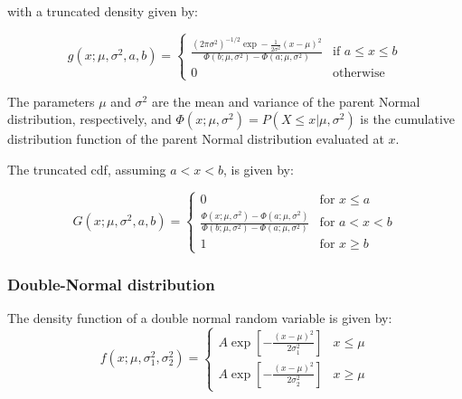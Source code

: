 \documentclass[review]{elsarticle}
\begin{document}
with a truncated density given by:

$$ g(x; \mu,\sigma^2,a,b) = \left\{ \begin{array}{ll}
	 \frac{(2\pi \sigma^2)^{-1/2} \exp -\frac{1}{2\sigma^2} (x-\mu)^2}{\Phi(b;\mu,\sigma^2) - \Phi(a; \mu,\sigma^2)} &  \text{if } a \le x \le b \\
	0 &  \text{otherwise}
\end{array} \right.
$$

The parameters $\mu$ and $\sigma^2$ are the mean and variance of the parent Normal distribution, respectively, and $\Phi(x;\mu,\sigma^2) = P(X \le x |\mu,\sigma^2)$ is the cumulative distribution function of the parent Normal distribution evaluated at $x$.

The truncated cdf, assuming $a<x<b$, is given by:

%
%

$$ G(x;\mu,\sigma^2,a,b) = \left\{ \begin{array}{ll} 0 & \text{for } x \le a \\
\frac{\Phi(x;\mu,\sigma^2) - \Phi(a; \mu,\sigma^2)}{\Phi(b;\mu,\sigma^2) - \Phi(a; \mu,\sigma^2)} & \text{for } a < x < b \\
1 & \text{for } x \ge b	
\end{array}
\right.
$$

\subsubsection*{Double-Normal distribution} 

The density function of a double normal random variable is given  by:
$$ f(x; \mu, \sigma_1^2, \sigma_2^2) = \left\{\begin{array}{ll}
	A \exp\left[-\frac{(x-\mu)^2}{2\sigma_1^2}\right] & x \le \mu \\[0.5em]
	A \exp\left[-\frac{(x-\mu)^2}{2\sigma_2^2}\right] & x \ge \mu 
\end{array}\right.
$$
\end{document}
